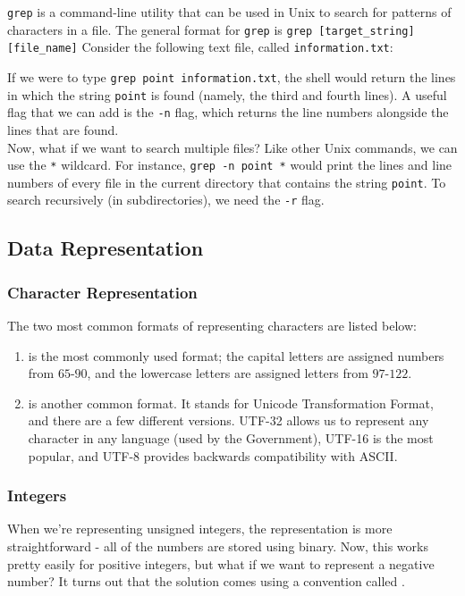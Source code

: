\verb!grep! is a command-line utility that can be used in Unix to search for patterns of characters in a file. The general format for \verb!grep! is \verb!grep [target_string] [file_name]! Consider the following text file, called \verb!information.txt!:

\lstset{
caption=Text Sample}
\begin{center}
\label{Text Sample}
\end{center}

If we were to type \verb!grep point information.txt!, the shell would return the lines in which the string \verb!point! is found (namely, the third and fourth lines). A useful flag that we can add is the \verb!-n! flag, which returns the line numbers alongside the lines that are found. \\

Now, what if we want to search multiple files? Like other Unix commands, we can use the \verb!*! wildcard. For instance, \verb!grep -n point *! would print the lines and line numbers of every file in the current directory that contains the string \verb!point!. To search recursively (in subdirectories), we need the \verb!-r! flag. 




\subsection{Data Representation}
\subsubsection{Character Representation}
The two most common formats of representing characters are listed below: \begin{enumerate}
    \item {} is the most commonly used format; the capital letters are assigned numbers from $65$-$90$, and the lowercase letters are assigned letters from $97$-$122$. 
    \item {} is another common format. It stands for Unicode Transformation Format, and there are a few different versions. UTF-32 allows us to represent any character in any language (used by the Government), UTF-16 is the most popular, and UTF-8 provides backwards compatibility with ASCII.
\end{enumerate}
\subsubsection{Integers}
When we're representing unsigned integers, the representation is more straightforward - all of the numbers are stored using binary. Now, this works pretty easily for positive integers, but what if we want to represent a negative number? It turns out that the solution comes using a convention called . 


